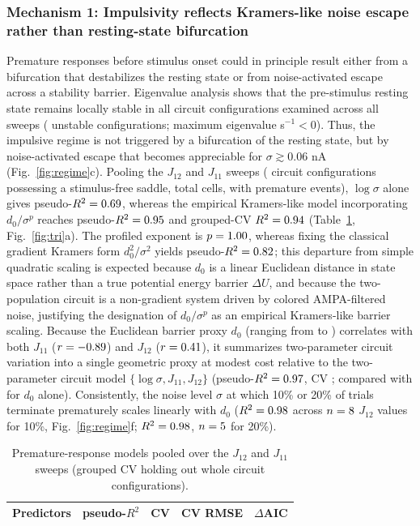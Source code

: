 \documentclass[11pt]{article}
\begin{document}
	\subsubsection{Mechanism 1: Impulsivity reflects Kramers-like noise escape rather than resting-state bifurcation}
	Premature responses before stimulus onset could in principle result either from a bifurcation that destabilizes the resting state or from noise-activated escape across a stability barrier. Eigenvalue analysis shows that the pre-stimulus resting state remains locally stable in all \nRestTotal{} circuit configurations examined across all sweeps (\nPrestimUnstable{} unstable configurations; maximum eigenvalue \restLamMax{} s$^{-1}<0$). Thus, the impulsive regime is not triggered by a bifurcation of the resting state, but by noise-activated escape that becomes appreciable for $\sigma\gtrsim0.06$ nA (Fig.~\ref{fig:regime}c). Pooling the $J_{12}$ and $J_{11}$ sweeps (\premNCirc{} circuit configurations possessing a stimulus-free saddle, \premNRows{} total cells, \premNEvents{} with premature events), $\log\sigma$ alone gives pseudo-$R^2=0.69$, whereas the empirical Kramers-like model incorporating $d_0/\sigma^{p}$ reaches pseudo-$R^2=0.95$ and grouped-CV $R^2=0.94$ (Table~\ref{tab:prem}, Fig.~\ref{fig:tri}a). The profiled exponent is $p=1.00$, whereas fixing the classical gradient Kramers form $d_0^2/\sigma^2$ yields pseudo-$R^2=0.82$; this departure from simple quadratic scaling is expected because $d_0$ is a linear Euclidean distance in state space rather than a true potential energy barrier $\Delta U$, and because the two-population circuit is a non-gradient system driven by colored AMPA-filtered noise, justifying the designation of $d_0/\sigma^p$ as an empirical Kramers-like barrier scaling. Because the Euclidean barrier proxy $d_0$ (ranging from \premDLo{} to \premDHi{}) correlates with both $J_{11}$ ($r=-0.89$) and $J_{12}$ ($r=0.41$), it summarizes two-parameter circuit variation into a single geometric proxy at modest cost relative to the two-parameter circuit model $\{\log\sigma,J_{11},J_{12}\}$ (pseudo-$R^2=0.97$, CV \premParCV; compared with \premDR{} for $d_0$ alone). Consistently, the noise level $\sigma$ at which 10\% or 20\% of trials terminate prematurely scales linearly with $d_0$ ($R^2=0.98$ across $n=8$ $J_{12}$ values for 10\%, Fig.~\ref{fig:regime}f; $R^2=0.98$, $n=5$ for 20\%).
	
	\begin{table}[t]\centering\small
		\begin{tabular}{lcccc}\toprule
			Predictors & pseudo-$R^2$ & CV & CV RMSE & $\Delta$AIC\\\midrule
			
		\end{tabular}
		\caption{Premature-response models pooled over the $J_{12}$ and $J_{11}$ sweeps (grouped CV holding out whole circuit configurations).}
		\label{tab:prem}
	\end{table}
	
\end{document}
